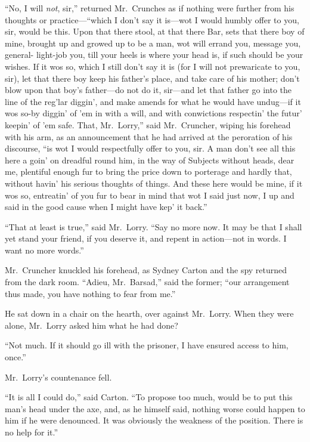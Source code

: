 ``No, I will \emph{not}, sir,'' returned Mr.\ Crunches as if nothing were
further from his thoughts or practice---``which I don't say it is---wot
I would humbly offer to you, sir, would be this.  Upon that there
stool, at that there Bar, sets that there boy of mine, brought up and
growed up to be a man, wot will errand you, message you, general-%
light-job you, till your heels is where your head is, if such should
be your wishes.  If it wos so, which I still don't say it is (for I
will not prewaricate to you, sir), let that there boy keep his
father's place, and take care of his mother; don't blow upon that
boy's father---do not do it, sir---and let that father go into the line
of the reg'lar diggin', and make amends for what he would have
undug---if it wos so-by diggin' of 'em in with a will, and with
conwictions respectin' the futur' keepin' of 'em safe.  That,
Mr.\ Lorry,'' said Mr.\ Cruncher, wiping his forehead with his arm, as
an announcement that he had arrived at the peroration of his
discourse, ``is wot I would respectfully offer to you, sir.  A man
don't see all this here a goin' on dreadful round him, in the way of
Subjects without heads, dear me, plentiful enough fur to bring the
price down to porterage and hardly that, without havin' his serious
thoughts of things.  And these here would be mine, if it wos so,
entreatin' of you fur to bear in mind that wot I said just now, I up
and said in the good cause when I might have kep' it back.''

``That at least is true,'' said Mr.\ Lorry.  ``Say no more now.  It may be
that I shall yet stand your friend, if you deserve it, and repent in
action---not in words.  I want no more words.''

Mr.\ Cruncher knuckled his forehead, as Sydney Carton and the spy
returned from the dark room.  ``Adieu, Mr.\ Barsad,'' said the former;
``our arrangement thus made, you have nothing to fear from me.''

He sat down in a chair on the hearth, over against Mr.\ Lorry.
When they were alone, Mr.\ Lorry asked him what he had done?

``Not much.  If it should go ill with the prisoner, I have ensured
access to him, once.''

Mr.\ Lorry's countenance fell.

``It is all I could do,'' said Carton.  ``To propose too much, would be
to put this man's head under the axe, and, as he himself said,
nothing worse could happen to him if he were denounced.  It was
obviously the weakness of the position.  There is no help for it.''

